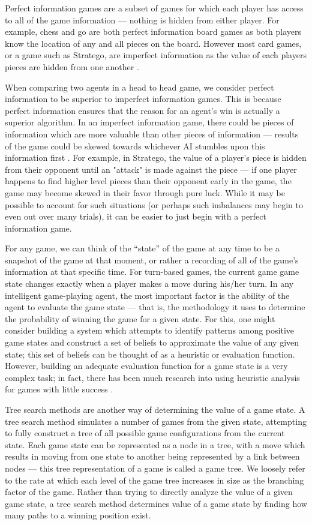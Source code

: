 Perfect information games are a subset of games for which each player has access to all of the game information --- nothing is hidden from either player.  For example, chess and go are both perfect information board games as both players know the location of any and all pieces on the board.  However most card games, or a game such as Stratego, are imperfect information as the value of each players pieces are hidden from one another \cite{Policonomics}.

When comparing two agents in a head to head game, we consider perfect information to be superior to imperfect information games.  This is because perfect information ensures that the reason for an agent's win is actually a superior algorithm.  In an imperfect information game, there could be pieces of information which are more valuable than other pieces of information --- results of the game could be skewed towards whichever AI stumbles upon this information first \cite{Gilpin}.  For example, in Stratego, the value of a player's piece is hidden from their opponent until an "attack" is made against the piece --- if one player happens to find higher level pieces than their opponent early in the game, the game may become skewed in their favor through pure luck.  While it may be possible to account for such situations (or perhaps such imbalances may begin to even out over many trials), it can be easier to just begin with a perfect information game.

For any game, we can think of the ``state'' of the game at any time to be a snapshot of the game at that moment, or rather a recording of all of the game's information at that specific time.  For turn-based games, the current game game state changes exactly when a player makes a move during his/her turn.  In any intelligent game-playing agent, the most important factor is the ability of the agent to evaluate the game state --- that is, the methodology it uses to determine the probability of winning the game for a given state.  For this, one might consider building a system which attempts to identify patterns among positive game states and construct a set of beliefs to approximate the value of any given state; this set of beliefs can be thought of as a heuristic or evaluation function.  However, building an adequate evaluation function for a game state is a very complex task; in fact, there has been much research into using heuristic analysis for games with little success \cite{chaslot2008monte}.

Tree search methods are another way of determining the value of a game state.  A tree search method simulates a number of games from the given state, attempting to fully construct a tree of all possible game configurations from the current state.  Each game state can be represented as a node in a tree, with a move which results in moving from one state to another being represented by a link between nodes  --- this tree representation of a game is called a game tree.  We loosely refer to the rate at which each level of the game tree increases in size as the branching factor of the game.  Rather than trying to directly analyze the value of a given game state, a tree search method determines value of a game state by finding how many paths to a winning position exist.

